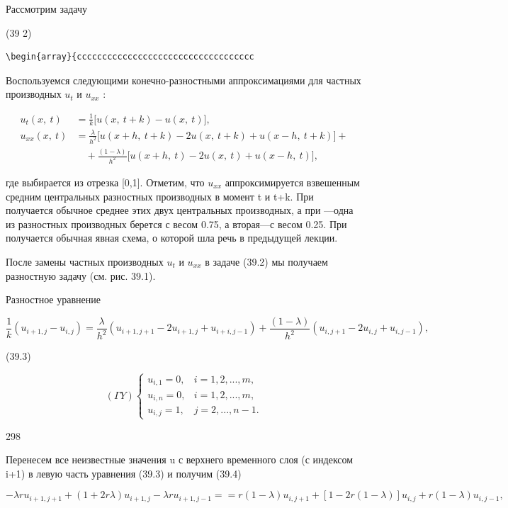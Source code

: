 \documentclass[
  ukrainian,
]{article}
\begin{document}
Рассмотрим задачу

(39 2)

\begin{verbatim}
\begin{array}{ccccccccccccccccccccccccccccccccccc
\end{verbatim}

Воспользуемся следующими конечно-разностными аппроксимациями для частных
производных \(u_t\) и \(u_{xx}\) :

\[
\begin{split} u_t(x,\ t) &= \frac{1}{k} \big[ u(x,\ t+k) - u(x,\ t) \big], \\ u_{xx}(x,\ t) &= \frac{\lambda}{h^2} \big[ u(x+h,\ t+k) - 2u(x,\ t+k) + u(x-h,\ t+k) \big] + \\ &\quad + \frac{(1-\lambda)}{h^2} \big[ u(x+h,\ t) - 2u(x,\ t) + u(x-h,\ t) \big], \end{split}
\]

где \lambda  выбирается из отрезка {[}0,1{]}. Отметим, что \(u_{xx}\)
аппроксимируется взвешенным средним центральных разностных производных в
момент t и t+k. При  получается обычное среднее этих двух
центральных производных, а при  ---одна из разностных
производных берется с весом 0.75, а вторая---с весом 0.25. При 
получается обычная явная схема, о которой шла речь в предыдущей лекции.

После замены частных производных \(u_t\) и \(u_{xx}\) в задаче (39.2) мы
получаем разностную задачу (см. рис. 39.1).

Разностное уравнение

\[
\frac{1}{k} (u_{i+1, j} - u_{i, j}) = \frac{\lambda}{h^2} (u_{i+1, j+1} - 2u_{i+1, j} + u_{i+i, j-1}) + \frac{(1-\lambda)}{h^2} (u_{i, j+1} - 2u_{i, j} + u_{i, j-1}),
\]

(39.3)

\[
(\Gamma Y) \begin{cases} u_{i, 1} = 0, & i = 1, 2, ..., m, \\ u_{i, n} = 0, & i = 1, 2, ..., m, \\ u_{i, j} = 1, & j = 2, ..., n-1. \end{cases}
\]

298

Перенесем все неизвестные значения u с верхнего временного слоя (с
индексом i+1) в левую часть уравнения (39.3) и получим (39.4)

\[
-\lambda r u_{i+1, j+1} + (1+2r\lambda) u_{i+1, j} - \lambda r u_{i+1, j-1} = = r(1-\lambda) u_{i, j+1} + [1-2r(1-\lambda)] u_{i, j} + r(1-\lambda) u_{i, j-1},
\]
\end{document}
